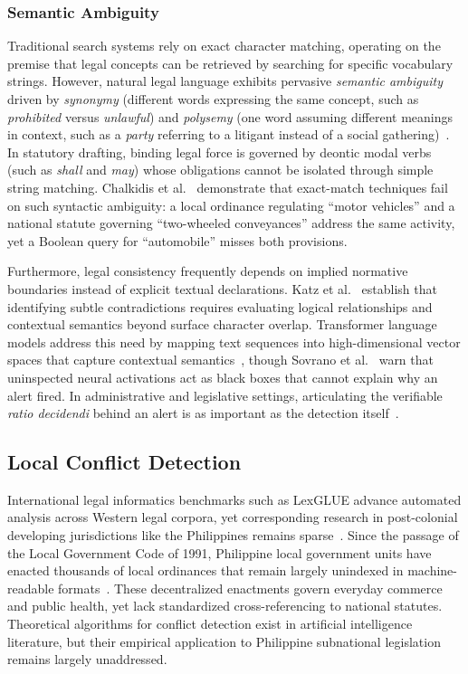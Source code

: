         \subsubsection{Semantic Ambiguity}
        Traditional search systems rely on exact character matching, operating on the premise that legal concepts can be retrieved by searching for specific vocabulary strings. However, natural legal language exhibits pervasive \textit{semantic ambiguity} driven by \textit{synonymy} (different words expressing the same concept, such as \textit{prohibited} versus \textit{unlawful}) and \textit{polysemy} (one word assuming different meanings in context, such as a \textit{party} referring to a litigant instead of a social gathering)~\cite{chalkidis2022lexglue, Greco2023Bringing}. In statutory drafting, binding legal force is governed by deontic modal verbs (such as \textit{shall} and \textit{may}) whose obligations cannot be isolated through simple string matching. Chalkidis et al.~\cite{chalkidis2022lexglue} demonstrate that exact-match techniques fail on such syntactic ambiguity: a local ordinance regulating ``motor vehicles'' and a national statute governing ``two-wheeled conveyances'' address the same activity, yet a Boolean query for ``automobile'' misses both provisions.

        Furthermore, legal consistency frequently depends on implied normative boundaries instead of explicit textual declarations. Katz et al.~\cite{katz_2023_legal_nlp} establish that identifying subtle contradictions requires evaluating logical relationships and contextual semantics beyond surface character overlap. Transformer language models address this need by mapping text sequences into high-dimensional vector spaces that capture contextual semantics~\cite{zheng2021when}, though Sovrano et al.~\cite{Sovrano2021Making} warn that uninspected neural activations act as black boxes that cannot explain why an alert fired. In administrative and legislative settings, articulating the verifiable \textit{ratio decidendi} behind an alert is as important as the detection itself~\cite{savelka2021discovering}.

    \subsection{Local Conflict Detection}
    International legal informatics benchmarks such as LexGLUE advance automated analysis across Western legal corpora, yet corresponding research in post-colonial developing jurisdictions like the Philippines remains sparse~\cite{chalkidis2022lexglue}. Since the passage of the Local Government Code of 1991, Philippine local government units have enacted thousands of local ordinances that remain largely unindexed in machine-readable formats~\cite{philgov1991ra7160}. These decentralized enactments govern everyday commerce and public health, yet lack standardized cross-referencing to national statutes. Theoretical algorithms for conflict detection exist in artificial intelligence literature, but their empirical application to Philippine subnational legislation remains largely unaddressed.


